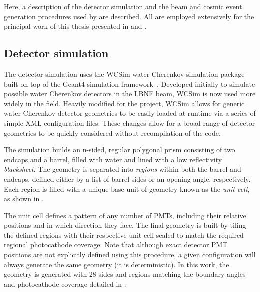 Here, a description of the detector simulation and the beam and cosmic event generation procedures
used by \chips are described. All are employed extensively for the principal work of this thesis
presented in  and .

\subsection{Detector simulation} %
\label{sec:chips_monte_carlo_sim} %

The detector simulation uses the WCSim water Cherenkov simulation package~\cite{wcsim2020} built
on top of the Geant4 simulation framework~\cite{agostinelli2003, allison2006, allison2016}.
Developed initially to simulate possible water Cherenkov detectors in the LBNF beam, WCSim is now
used more widely in the field. Heavily modified for the \chips project, WCSim allows for generic
water Cherenkov detector geometries to be easily loaded at runtime via a series of simple XML
configuration files. These changes allow for a broad range of detector geometries to be quickly
considered without recompilation of the code.

The simulation builds an n-sided, regular polygonal prism consisting of two endcaps and a barrel,
filled with water and lined with a low reflectivity \emph{blacksheet}. The geometry is separated
into \emph{regions} within both the barrel and endcaps, defined either by a list of barrel sides
or an opening angle, respectively. Each region is filled with a unique base unit of geometry known
as the \emph{unit cell}, as shown in .

The unit cell defines a pattern of any number of PMTs, including their relative positions and in
which direction they face. The final geometry is built by tiling the defined regions with their
respective unit cell scaled to match the required regional photocathode coverage. Note that
although exact detector PMT positions are not explicitly defined using this procedure, a given
configuration will always generate the same geometry (it is deterministic). In this work, the
\chipsfive geometry is generated with 28 sides and regions matching the boundary angles and
photocathode coverage detailed in .

